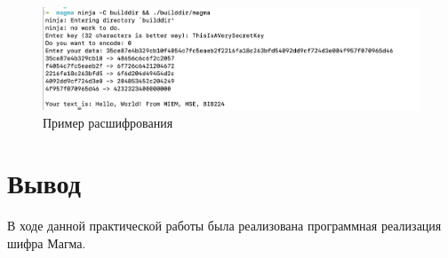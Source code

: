 \documentclass[a4paper]{article}
\begin{document}
  \begin{figure}[H]
    \includegraphics[width=\textwidth]{16_3}
    \caption{Пример расшифрования}
  \end{figure}

  \section{Вывод}

  В ходе данной практической работы была реализована программная реализация
  шифра Магма.

  
\end{document}

